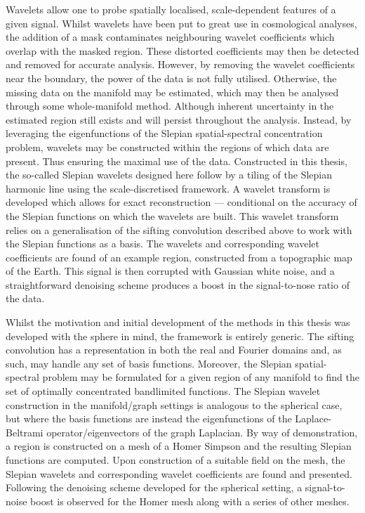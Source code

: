 Wavelets allow one to probe spatially localised, scale-dependent features of a given signal.
Whilst wavelets have been put to great use in cosmological analyses, the addition of a mask contaminates neighbouring wavelet coefficients which overlap with the masked region.
These distorted coefficients may then be detected and removed for accurate analysis.
However, by removing the wavelet coefficients near the boundary, the power of the data is not fully utilised.
Otherwise, the missing data on the manifold may be estimated, which may then be analysed through some whole-manifold method.
Although inherent uncertainty in the estimated region still exists and will persist throughout the analysis.
Instead, by leveraging the eigenfunctions of the Slepian spatial-spectral concentration problem, wavelets may be constructed within the regions of which data are present.
Thus ensuring the maximal use of the data.
Constructed in this thesis, the so-called Slepian wavelets designed here follow by a tiling of the Slepian harmonic line using the scale-discretised framework.
A wavelet transform is developed which allows for exact reconstruction --- conditional on the accuracy of the Slepian functions on which the wavelets are built.
This wavelet transform relies on a generalisation of the sifting convolution described above to work with the Slepian functions as a basis.
The wavelets and corresponding wavelet coefficients are found of an example region, constructed from a topographic map of the Earth.
This signal is then corrupted with Gaussian white noise, and a straightforward denoising scheme produces a boost in the signal-to-nose ratio of the data.

Whilst the motivation and initial development of the methods in this thesis was developed with the sphere in mind, the framework is entirely generic.
The sifting convolution has a representation in both the real and Fourier domains and, as such, may handle any set of basis functions.
Moreover, the Slepian spatial-spectral problem may be formulated for a given region of any manifold to find the set of optimally concentrated bandlimited functions.
The Slepian wavelet construction in the manifold/graph settings is analogous to the spherical case, but where the basis functions are instead the eigenfunctions of the Laplace-Beltrami operator/eigenvectors of the graph Laplacian.
By way of demonstration, a region is constructed on a mesh of a Homer Simpson and the resulting Slepian functions are computed.
Upon construction of a suitable field on the mesh, the Slepian wavelets and corresponding wavelet coefficients are found and presented.
Following the denoising scheme developed for the spherical setting, a signal-to-noise boost is observed for the Homer mesh along with a series of other meshes.


